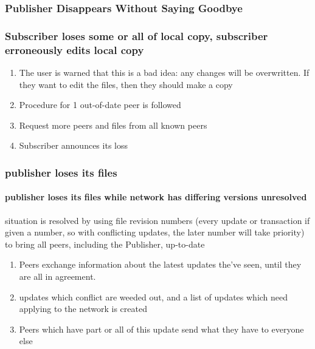 \documentclass[12pt,a4paper,]{book}
\begin{document}
\subsubsection{Publisher Disappears Without Saying
Goodbye}\label{publisher-disappears-without-saying-goodbye}

\subsubsection{Subscriber loses some or all of local copy, subscriber
erroneously edits local
copy}\label{subscriber-loses-some-or-all-of-local-copy-subscriber-erroneously-edits-local-copy}

\begin{enumerate}
\def\labelenumi{\arabic{enumi}.}
\itemsep1pt\parskip0pt
\item
  The user is warned that this is a bad idea: any changes will be
  overwritten. If they want to edit the files, then they should make a
  copy
\item
  Procedure for 1 out-of-date peer is followed
\item
  Request more peers and files from all known peers
\item
  Subscriber announces its loss
\end{enumerate}

\subsubsection{publisher loses its
files}\label{publisher-loses-its-files}

\paragraph{publisher loses its files while network has differing
versions
unresolved}\label{publisher-loses-its-files-while-network-has-differing-versions-unresolved}

situation is resolved by using file revision numbers (every update or
transaction if given a number, so with conflicting updates, the later
number will take priority) to bring all peers, including the Publisher,
up-to-date

\begin{enumerate}
\def\labelenumi{\arabic{enumi}.}
\itemsep1pt\parskip0pt
\item
  Peers exchange information about the latest updates the've seen, until
  they are all in agreement.
\item
  updates which conflict are weeded out, and a list of updates which
  need applying to the network is created
\item
  Peers which have part or all of this update send what they have to
  everyone else
\end{enumerate}
\end{document}

